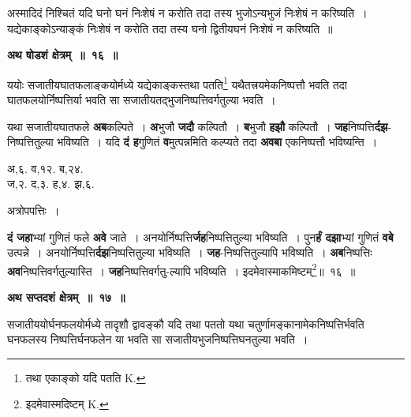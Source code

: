 \documentclass[11pt, openany]{book}
\begin{document}
अस्मादिदं निश्चितं यदि घनो घनं निःशेषं न करोति तदा तस्य भुजोऽन्यभुजं निःशेषं न करिष्यति~। यद्येकाङ्कोऽन्याङ्कं निःशेषं न करोति तदा तस्य घनो द्वितीयघनं निःशेषं न करिष्यति~॥ 
\vspace{2mm}

\begin{center}
\textbf{\large अथ षोडशं क्षेत्रम्~॥~१६~॥}
\end{center}

{\ab  ययोः सजातीयघातफलाङ्कयोर्मध्ये यद्येकाङ्कस्तथा पतति\renewcommand{\thefootnote}{२}\footnote{तथा एकाङ्को यदि पतति {\en K.}} यथैतत्त्रयमेकनिष्पत्तौ भवति तदा घातफलयोर्निष्पत्तिर्या भवति सा सजातीयतद्भुजनिष्पत्तिवर्गतुल्या भवति~। }

\begin{flushleft}
\begin{minipage}[t]{0.65\textwidth}
\hspace{4mm}  यथा सजातीयघातफले \textbf{अब}कल्पिते~। \textbf{अ}भुजौ \textbf{जदौ} कल्पितौ~। \textbf{ब}भुजौ  \textbf{हझौ} कल्पितौ~। \textbf{जह}निष्पत्ति\textbf{र्दझ}-निष्पत्तितुल्या भविष्यति~। यदि \textbf{दं ह}गुणितं \textbf{व}मुत्पन्नमिति कल्प्यते तदा  \textbf{अवबा} एकनिष्पत्तौ भविष्यन्ति~।
\end{minipage} 
\hfill
\begin{minipage}[t]{0.28\textwidth}
अ,६. व,१२. ब,२४.\\
ज,२. द,३. ह,४. झ,६.
\end{minipage}
\end{flushleft}

\newpage
\begin{center}
अत्रोपपत्तिः~। 
\end{center}

\textbf{दं जहा}भ्यां गुणितं फले \textbf{अवे} जाते~। अनयोर्निष्पत्ति\textbf{र्जह}निष्पत्तितुल्या भविष्यति~। पुन\textbf{र्हं दझा}भ्यां गुणितं \textbf{वबे} उत्पन्ने~। अनयोर्निष्पत्ति\textbf{र्दझ}निष्पत्तितुल्या भविष्यति~। \textbf{जह}-निष्पत्तितुल्यापि भविष्यति~। \textbf{अब}निष्पत्तिः \textbf{अव}निष्पत्तिवर्गतुल्यास्ति~। \textbf{जह}निष्पत्तिवर्गतु-ल्यापि भविष्यति~। इदमेवास्माकमिष्टम्\renewcommand{\thefootnote}{१}\footnote{इदमेवास्मदिष्टम् {\en K.}}\;॥~१६~॥ 
\vspace{2mm}

\begin{center}
\textbf{\large अथ सप्तदशं क्षेत्रम्~॥~१७~॥}
\end{center}

 {\ab सजातीययोर्घनफलयोर्मध्ये तादृशौ द्वावङ्कौ यदि तथा पततो यथा चतुर्णामङ्कानामेकनिष्पत्तिर्भवति घनफलस्य निष्पत्तिर्घनफलेन या भवति सा सजातीयभुजनिष्पत्तिघनतुल्या भवति~। }
\end{document}
